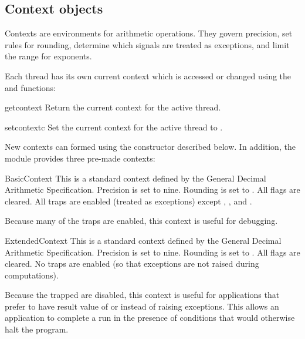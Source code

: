 \subsection{Context objects \label{decimal-decimal}}

Contexts are environments for arithmetic operations.  They govern precision,
set rules for rounding, determine which signals are treated as exceptions, and
limit the range for exponents.

Each thread has its own current context which is accessed or changed using
the  and  functions:

\begin{funcdesc}{getcontext}{}
  Return the current context for the active thread.                                          
\end{funcdesc}            

\begin{funcdesc}{setcontext}{c}
  Set the current context for the active thread to .                                          
\end{funcdesc}  

New contexts can formed using the  constructor described below.
In addition, the module provides three pre-made contexts:                                          


\begin{classdesc*}{BasicContext}
  This is a standard context defined by the General Decimal Arithmetic
  Specification.  Precision is set to nine.  Rounding is set to
  .  All flags are cleared.  All traps are enabled
  (treated as exceptions) except , , and
  .

  Because many of the traps are enabled, this context is useful for debugging.
\end{classdesc*}

\begin{classdesc*}{ExtendedContext}
  This is a standard context defined by the General Decimal Arithmetic
  Specification.  Precision is set to nine.  Rounding is set to
  .  All flags are cleared.  No traps are enabled
  (so that exceptions are not raised during computations).

  Because the trapped are disabled, this context is useful for applications
  that prefer to have result value of  or 
  instead of raising exceptions.  This allows an application to complete a
  run in the presence of conditions that would otherwise halt the program.
\end{classdesc*}

